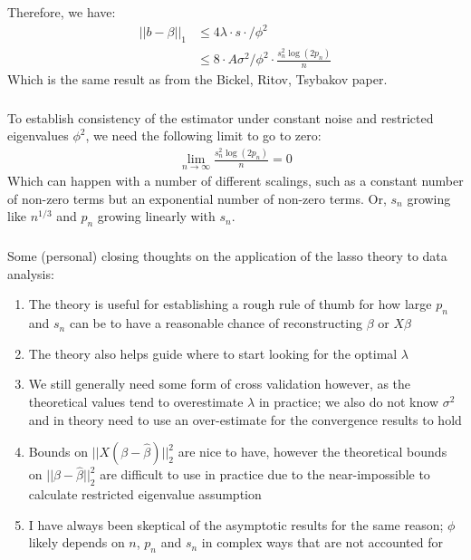 \begin{frame}[fragile] \frametitle{}

Therefore, we have:
\begin{align*}
|| b - \beta ||_1 &\leq 4 \lambda \cdot s \cdot / \phi^2 \\
&\leq 8 \cdot A \sigma^2 / \phi^2 \cdot \frac{s_n^2 \log(2p_n)}{n}
\end{align*}
Which is the same result as from the Bickel, Ritov, Tsybakov paper.

\end{frame}

\begin{frame}[fragile] \frametitle{}

To establish consistency of the estimator under constant noise and
restricted eigenvalues $\phi^2$, we need the following limit to
go to zero:
\begin{align*}
\lim_{n \rightarrow \infty} \frac{s_n^2 \log(2p_n)}{n} = 0
\end{align*}
Which can happen with a number of different scalings, such as a constant
number of non-zero terms but an exponential number of non-zero terms. Or,
$s_n$ growing like $n^{1/3}$ and $p_n$ growing linearly with $s_n$.

\end{frame}


\begin{frame}[fragile] \frametitle{}

Some (personal) closing thoughts on the application of the lasso theory
to data analysis:
\begin{enumerate}
\item The theory is useful for establishing a rough rule of thumb
for how large $p_n$ and $s_n$ can be to have a reasonable chance
of reconstructing $\beta$ or $X\beta$ \pause
\item The theory also helps guide where to start looking for the
optimal $\lambda$ \pause
\item We still generally need some form of cross validation however,
as the theoretical values tend to overestimate $\lambda$ in
practice; we also do not know $\sigma^2$ and in theory need to use
an over-estimate for the convergence results to hold \pause
\item Bounds on $|| X (\beta - \widehat{\beta}) ||_2^2$ are nice to have,
however the theoretical bounds on $|| \beta - \widehat{\beta} ||_2^2$
are difficult to use in practice due to the near-impossible to calculate
restricted eigenvalue assumption \pause
\item I have always been skeptical of the asymptotic results for the same
reason; $\phi$ likely depends on $n$, $p_n$ and $s_n$ in complex ways that
are not accounted for
\end{enumerate}

\end{frame}

